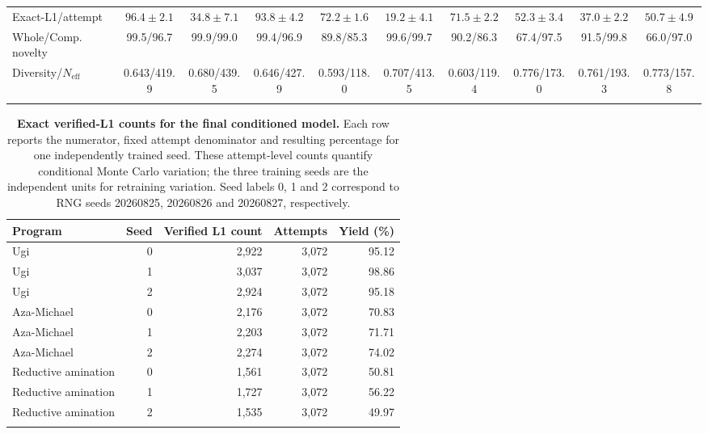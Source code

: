 \documentclass{article}
\theoremstyle{definition}
\begin{document}
\begin{table}[htbp]
{\begin{tabular}{@{}lccccccccc@{}}
Exact-L1/attempt & \cellcolor{forgerow} $96.4\pm2.1$ & $34.8\pm7.1$ & $93.8\pm4.2$ & \cellcolor{forgerow} $72.2\pm1.6$ & $19.2\pm4.1$ & $71.5\pm2.2$ & \cellcolor{forgerow} $52.3\pm3.4$ & $37.0\pm2.2$ & $50.7\pm4.9$ \\
Whole/Comp. novelty & \cellcolor{forgerow} 99.5/96.7 & 99.9/99.0 & 99.4/96.9 & \cellcolor{forgerow} 89.8/85.3 & 99.6/99.7 & 90.2/86.3 & \cellcolor{forgerow} 67.4/97.5 & 91.5/99.8 & 66.0/97.0 \\
Diversity/$N_{\mathrm{eff}}$ & \cellcolor{forgerow} 0.643/419.9 & 0.680/439.5 & 0.646/427.9 & \cellcolor{forgerow} 0.593/118.0 & 0.707/413.5 & 0.603/119.4 & \cellcolor{forgerow} 0.776/173.0 & 0.761/193.3 & 0.773/157.8 \\
\relax{}\end{tabular}
}
\end{table}



\begin{table}[htbp]
\caption{\textbf{Exact verified-L1 counts for the final conditioned model.}
Each row reports the numerator, fixed attempt denominator and resulting percentage for one
independently trained seed. These attempt-level counts quantify conditional Monte Carlo variation;
the three training seeds are the independent units for retraining variation. Seed
labels 0, 1 and 2 correspond to RNG seeds 20260825, 20260826 and 20260827, respectively.}
\label{tab:production-seed-counts}
\centering
\small
\setlength{\tabcolsep}{7pt}
\begin{tabular}{lrrrr}
\hline
Program & Seed & Verified L1 count & Attempts & Yield (\%) \\
\hline
Ugi & 0 & 2{,}922 & 3{,}072 & 95.12 \\
Ugi & 1 & 3{,}037 & 3{,}072 & 98.86 \\
Ugi & 2 & 2{,}924 & 3{,}072 & 95.18 \\
Aza-Michael & 0 & 2{,}176 & 3{,}072 & 70.83 \\
Aza-Michael & 1 & 2{,}203 & 3{,}072 & 71.71 \\
Aza-Michael & 2 & 2{,}274 & 3{,}072 & 74.02 \\
Reductive amination & 0 & 1{,}561 & 3{,}072 & 50.81 \\
Reductive amination & 1 & 1{,}727 & 3{,}072 & 56.22 \\
Reductive amination & 2 & 1{,}535 & 3{,}072 & 49.97 \\
\hline
\relax{}\end{tabular}
\end{table}
\end{document}
